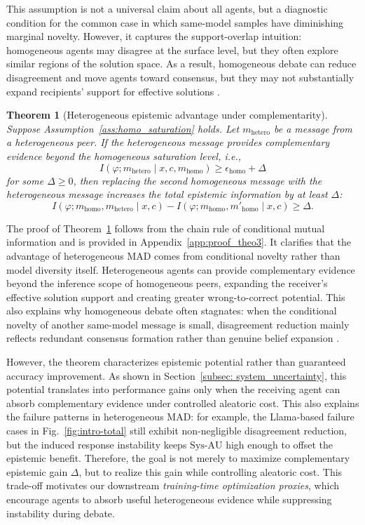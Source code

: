 \documentclass{article}
\theoremstyle{plain}
\newtheorem{theorem}{Theorem}[section]
\theoremstyle{definition}
\theoremstyle{remark}
\begin{document}
This assumption is not a universal claim about all agents, but a diagnostic condition for the common case in which same-model samples have diminishing marginal novelty. However, it captures the support-overlap intuition: homogeneous agents may disagree at the surface level, but they often explore similar regions of the solution space. As a result, homogeneous debate can reduce disagreement and move agents toward consensus, but they may not substantially expand recipients' support for effective solutions \cite{choi2025debate, zhang2025if, wynn2025talk}.


\begin{theorem}[Heterogeneous epistemic advantage under complementarity]\label{thm:hetero_gain}
Suppose Assumption~\ref{ass:homo_saturation} holds. Let $m_{\mathrm{hetero}}$ be a message from a heterogeneous peer. If the heterogeneous message provides complementary evidence beyond the homogeneous saturation level, i.e.,
\[
I(\varphi; m_{\mathrm{hetero}} \mid x,c,m_{\mathrm{homo}})
\ge
\epsilon_{\mathrm{homo}} + \Delta
\]
for some $\Delta \ge 0$, then replacing the second homogeneous message with the heterogeneous message increases the total epistemic information by at least $\Delta$:
\[
I(\varphi; m_{\mathrm{homo}},m_{\mathrm{hetero}} \mid x,c)
-
I(\varphi; m_{\mathrm{homo}},m'_{\mathrm{homo}} \mid x,c)
\ge
\Delta.
\]
\end{theorem}

The proof of Theorem~\ref{thm:hetero_gain} follows from the chain rule of conditional mutual information and is provided in Appendix~\ref{app:proof_theo3}. It clarifies that the advantage of heterogeneous MAD comes from conditional novelty rather than model diversity itself. Heterogeneous agents can provide complementary evidence beyond the inference scope of homogeneous peers, expanding the receiver's effective solution support and creating greater wrong-to-correct potential. This also explains why homogeneous debate often stagnates: when the conditional novelty of another same-model message is small, disagreement reduction mainly reflects redundant consensus formation rather than genuine belief expansion \cite{wynn2025talk}. 


However, the theorem characterizes epistemic potential rather than guaranteed accuracy improvement. As shown in Section~\ref{subsec: system_uncertainty}, this potential translates into performance gains only when the receiving agent can absorb complementary evidence under controlled aleatoric cost. This also explains the failure patterns in heterogeneous MAD: for example, the Llama-based failure cases in Fig.~\ref{fig:intro-total} still exhibit non-negligible disagreement reduction, but the induced response instability keeps $\mathrm{Sys\mbox{-}AU}$ high enough to offset the epistemic benefit. Therefore, the goal is not merely to maximize complementary epistemic gain $\Delta$, but to realize this gain while controlling aleatoric cost. This trade-off motivates our downstream \emph{training-time optimization proxies}, which encourage agents to absorb useful heterogeneous evidence while suppressing instability during debate.
\end{document}
